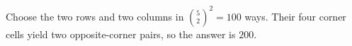 Choose the two rows and two columns in $\binom52^2=100 $ ways. Their four corner cells yield two opposite-corner pairs, so the answer is $\boxed{200}$.
